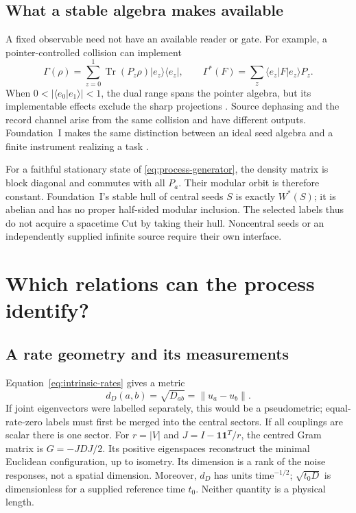 \documentclass[12pt,a4paper]{article}
\begin{document}
\subsection{What a stable algebra makes available}

A fixed observable need not have an available reader or gate.
For example, a pointer-controlled collision can implement
\[
 \Gamma(\rho)=\sum_{z=0}^1\operatorname{Tr}(P_z\rho)
                         |e_z\rangle\langle e_z|,
 \qquad
 \Gamma^*(F)=\sum_z\langle e_z|F|e_z\rangle P_z .
\]
When $0<|\langle e_0|e_1\rangle|<1$, the dual range spans the pointer
algebra, but its implementable effects exclude the sharp projections
\cite{Liu2026PaperE}. Source dephasing and the record channel arise
from the same collision and have different outputs. Foundation~I
makes the same distinction between an ideal seed algebra and a
finite instrument realizing a task \cite{LiuFoundationI}.

For a faithful stationary state of \eqref{eq:process-generator},
the density matrix is block diagonal and commutes with all $P_a$.
Their modular orbit is therefore constant. Foundation~I's stable
hull of central seeds $S$ is exactly $W^*(S)$; it is abelian and
has no proper half-sided modular inclusion. The selected labels
thus do not acquire a spacetime Cut by taking their hull.
Noncentral seeds or an independently supplied infinite source
require their own interface.

\section{Which relations can the process identify?}
\label{sec:rate-geometry}

\subsection{A rate geometry and its measurements}

Equation~\eqref{eq:intrinsic-rates} gives a metric
\begin{equation}
 d_D(a,b)=\sqrt{D_{ab}}=\|u_a-u_b\|.
 \label{eq:rate-metric}
\end{equation}
If joint eigenvectors were labelled separately, this would be a
pseudometric; equal-rate-zero labels must first be merged into the
central sectors. If all couplings are scalar there is one sector.
For $r=|V|$ and $J=I-\mathbf1\mathbf1^T/r$, the centred Gram matrix is
$G=-JDJ/2$. Its positive eigenspaces reconstruct the minimal Euclidean
configuration, up to isometry. Its dimension is a rank of the noise
responses, not a spatial dimension. Moreover, $d_D$ has units
$\mathrm{time}^{-1/2}$; $\sqrt{t_0D}$ is dimensionless for a supplied
reference time $t_0$. Neither quantity is a physical length.
\end{document}
